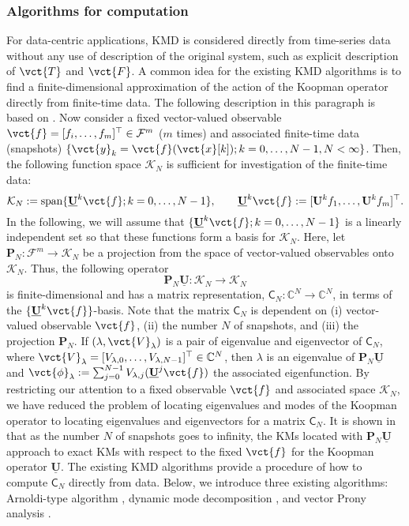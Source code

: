 \documentclass[a4paper,10pt]{article}
\def\bU{{\mathbf{U}}}
\def\bP{{\mathbf{P}}}
\def\bbC{{\mathbb{C}}}
\def\cF{{\mathcal{F}}}
\begin{document}
\subsubsection{Algorithms for computation}
\label{subsec:KM-algo}

For data-centric applications, KMD is considered directly from time-series data without any use of description of the original system, such as explicit description of $\vct{T}$ and $\vct{F}$.  
A common idea for the existing KMD algorithms is to find a finite-dimensional approximation of the action of the Koopman operator directly from finite-time data.  
The following description in this paragraph is based on \cite{Marko_CHAOS22}.  
Now consider a fixed vector-valued observable $\vct{f}=[f_i,\ldots,f_m]^\top\in\cF^m$ ($m$ times) and associated finite-time data (snapshots) $\{\vct{y}_k=\vct{f}(\vct{x}[k]); k=0,\ldots,N-1, N<\infty\}$.  
Then, the following function space $\mathcal{K}_N$ is sufficient for investigation of the finite-time data:
\[
\mathcal{K}_N:=\mathrm{span}\{\mathbf{\underline{U}}^k\vct{f}; k=0,\ldots,N-1\},
\makebox[2em]{}\mathbf{\underline{U}}^k\vct{f}:=[\bU^kf_1,\ldots,\bU^kf_m]^\top.
\]
In the following, we will assume that $\{\mathbf{\underline{U}}^k\vct{f}; k=0,\ldots,N-1\}$ is a linearly independent set so that these functions form a basis for $\mathcal{K}_N$.  
Here, let $\bP_N: \cF^m\to\mathcal{K}_N$ be a projection from the space of vector-valued observables onto $\mathcal{K}_N$. 
Thus, the following operator
\[
\bP_N\mathbf{\underline{U}}: \mathcal{K}_N\to\mathcal{K}_N
\]
is finite-dimensional and has a matrix representation, $\mathsf{C}_N: \bbC^N\to\bbC^N$, in terms of the $\{\mathbf{\underline{U}}^k\vct{f}\}$-basis. 
Note that the matrix $\mathsf{C}_N$ is dependent on (i) vector-valued observable $\vct{f}$, (ii) the number $N$ of snapshots, and (iii) the projection $\bP_N$.  
If $(\lambda,\vct{V}_\lambda)$ is a pair of eigenvalue and eigenvector of $\mathsf{C}_N$, where $\vct{V}_\lambda=[V_{\lambda,0},\ldots,V_{\lambda,N-1}]^\top\in\bbC^N$, then $\lambda$ is an eigenvalue of $\bP_N\mathbf{\underline{U}}$ and $\vct{\phi}_\lambda:=\sum^{N-1}_{j=0}V_{\lambda,j}(\mathbf{\underline{U}}^j\vct{f})$ the associated eigenfunction.  
By restricting our attention to a fixed observable $\vct{f}$ and associated space $\mathcal{K}_N$, we have reduced the problem of locating eigenvalues and modes of the Koopman operator to locating eigenvalues and eigenvectors for a matrix $\mathsf{C}_N$.  
It is shown in \cite{Hassan_Preprint} that as the number $N$ of snapshots goes to infinity, the KMs located with $\bP_N\mathbf{\underline{U}}$ approach to exact KMs with respect to the fixed $\vct{f}$ for the Koopman operator $\mathbf{\underline{U}}$.  
The existing KMD algorithms provide a procedure of how to compute $\mathsf{C}_N$ directly from data.  
Below, we introduce three existing algorithms: Arnoldi-type algorithm \cite{Rowley_JFM641}, dynamic mode decomposition \cite{Schmid_JFM656,Chen_JNLS22,Jovanovic_PF26,Tu_JCD1}, and vector Prony analysis \cite{Susuki_CDC15}. 
\end{document}
